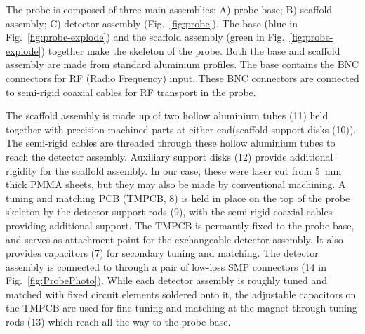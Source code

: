 \documentclass[preprint,5p]{elsarticle}
\newcommand{\fig}[1]{Fig.~\ref{#1}}
\begin{document}
The probe is composed of three main assemblies: A) probe base; B) scaffold assembly; 
C) detector assembly (\fig{fig:probe}). 
The  base (blue in \fig{fig:probe-explode}) and the scaffold assembly 
(green in \fig{fig:probe-explode}) together make the skeleton of the probe. 
Both the base and scaffold assembly are made from standard aluminium profiles. 
The base contains the BNC connectors for RF (Radio Frequency) input. 
These BNC connectors are connected to semi-rigid coaxial cables for 
RF transport in the probe.

The scaffold assembly is made up of two hollow aluminium tubes (11) held together with 
precision machined parts at either end(scaffold support disks (10)). 
The semi-rigid cables are  threaded through these hollow aluminium tubes 
to reach the detector assembly. 
Auxiliary support disks (12) provide additional rigidity for the scaffold assembly. 
In our case, these were laser cut from 5~mm thick PMMA sheets, 
but they may also be made by conventional machining.
A tuning and matching PCB (TMPCB, 8) is held in place on the top of the probe skeleton by
the detector support rods (9), with the semi-rigid coaxial cables providing
additional support.
The TMPCB is permantly fixed to the probe base, and serves as attachment point
for the exchangeable detector assembly. It also provides 
capacitors (7) for secondary tuning and matching.
The detector assembly is connected to through a pair of
low-loss SMP connectors (14 in \fig{fig:ProbePhoto}).
While each detector assembly is roughly
tuned and matched with fixed circuit elements soldered onto it,
the adjustable capacitors on the TMPCB are used for 
fine tuning and matching 
at the magnet through tuning rods (13) which reach all the way to the probe base. 
\end{document}
